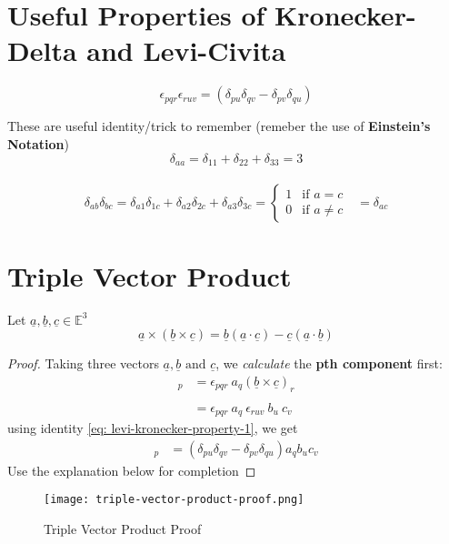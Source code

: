 \section{Useful Properties of Kronecker-Delta and Levi-Civita}
\begin{theorem}
	\begin{equation}
		\label{eq: levi-kronecker-property-1}
		\epsilon_{pqr}\epsilon_{ruv} = (\delta_{pu}\delta_{qv} - \delta_{pv}\delta_{qu})
	\end{equation}
\end{theorem}
\begin{note}
	These are useful identity/trick to remember (remeber the use of {\bf Einstein's Notation})
	$$\delta_{aa} = \delta_{11} + \delta_{22} + \delta_{33} = 3$$
	\\
	\begin{equation*}
		\delta_{ab}\delta_{bc}=\delta_{a1}\delta_{1c} + \delta_{a2}\delta_{2c} + \delta_{a3}\delta_{3c}
		= \begin{cases}
			1 & \text{if } a = c    \\
			0 & \text{if } a \neq c
		\end{cases}
		\ \ \ = \delta_{ac}
	\end{equation*}
\end{note}


\section{Triple Vector Product}
\begin{theorem}
	Let $\underline{a}, \underline{b}, \underline{c} \in \mathbb{E}^3$
	\begin{equation}
		\label{eq: triple-vector-product}
		\underline{a} \times (\underline{b} \times \underline{c}) = \underline{b}(\underline{a} \cdot \underline{c}) - \underline{c}(\underline{a} \cdot \underline{b})
	\end{equation}
\end{theorem}
\begin{proof}
	Taking three vectors $\underline{a}, \underline{b} \text{ and } \underline{c}$, we {\em calculate} the \textbf{pth component} first:
	\begin{align*}
		[\underline{a} \times (\underline{b} \times \underline{c})]_{p} & = \epsilon_{pqr}\ a_{q}(\underline{b} \times \underline{c})_{r} \\ \\
		                                                                & = \epsilon_{pqr}\ a_{q} \ \epsilon_{ruv}\ b_{u}\ c_{v}
	\end{align*}
	using identity \ref{eq: levi-kronecker-property-1}, we get
	\begin{align*}
		[\underline{a} \times (\underline{b} \times \underline{c})]_{p} & = (\delta_{pu}\delta_{qv} - \delta_{pv}\delta_{qu})a_{q}b_{u}c_{v}
	\end{align*}
	Use the explanation below for completion
\end{proof}

\begin{figure}[H]
	\centering
	\texttt{[image: triple-vector-product-proof.png]}
	\caption{Triple Vector Product Proof}
	\label{fig:figure-triple-vector-product-proof}
\end{figure}

\clearpage
